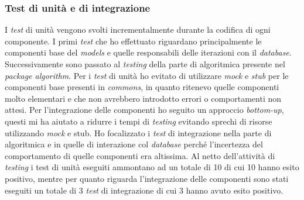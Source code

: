 \subsubsection{Test di unità e di integrazione}
I \emph{test} di unità vengono svolti incrementalmente durante la codifica di ogni componente. I primi \emph{test} che ho effettuato riguardano principalmente le componenti base del \emph{models} e quelle responsabili delle iterazioni con il \emph{database}. Successivamente sono passato al \emph{testing} della parte di algoritmica presente nel \emph{package algorithm}. Per i \emph{test} di unità ho evitato di utilizzare \emph{mock} e \emph{stub} per le componenti base presenti in \emph{commons}, in quanto ritenevo quelle componenti molto elementari e che non avrebbero introdotto errori o comportamenti non attesi. Per l'integrazione delle componenti ho seguito un approccio \emph{bottom-up}, questi mi ha aiutato a ridurre i tempi di \emph{testing} evitando sprechi di risorse utilizzando \emph{mock} e {stub}. Ho focalizzato i \emph{test} di integrazione nella parte di algoritmica e in quelle di interazione col \emph{database} perché l'incertezza del comportamento di quelle componenti era altissima.
Al netto dell'attività di \emph{testing} i test di unità eseguiti ammontano ad un totale di 10 di cui 10 hanno esito positivo, mentre per quanto riguarda l'integrazione delle componenti sono stati eseguiti un totale di 3 \emph{test} di integrazione di cui 3 hanno avuto esito positivo.

